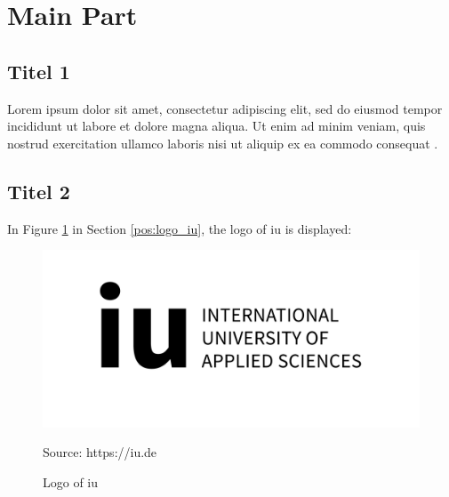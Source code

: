 \section{Main Part}

\lipsum[1]

\subsection{Titel 1}

Lorem ipsum dolor sit amet, consectetur adipiscing elit, sed do eiusmod tempor incididunt ut labore et dolore magna aliqua. Ut enim ad minim veniam, quis nostrud exercitation ullamco laboris nisi ut aliquip ex ea commodo consequat \parencite[1]{nussbaum}.


\subsection{Titel 2}

In Figure \ref*{fig:logo_iu} in Section \ref*{pos:logo_iu}, the logo of \ac{iu} is displayed:

\begin{figure}[ht!]
    \label{pos:logo_iu}
    \includegraphics[scale=0.35]{logos/iu_Logo_EN.jpg}
    \caption[Logo of \acs{iu}]{Logo of \ac{iu}}{Source: https://iu.de}
    \label{fig:logo_iu}
\end{figure}


\lipsum[7-8]